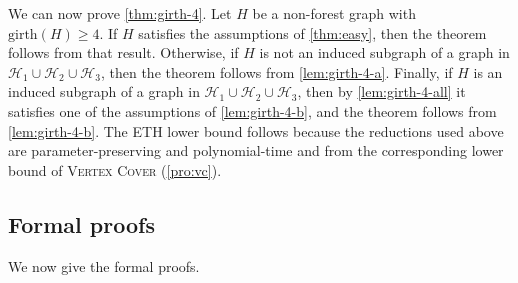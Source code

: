 \documentclass[a4paper,UKenglish,cleveref, autoref, thm-restate]{lipics-v2021}
\newcommand{\girth}{\mathrm{girth}}
\newcommand{\cH}{\mathcal{H}}
\begin{document}
We can now prove \cref{thm:girth-4}.
Let $H$ be a non-forest graph with $\girth(H)\geq 4$.
If $H$ satisfies the assumptions of \cref{thm:easy}, then the theorem follows from that result.
Otherwise, if $H$ is not an induced subgraph of a graph in
$\mathcal H_1\cup\mathcal H_2\cup\mathcal H_3$, then the theorem follows from
\cref{lem:girth-4-a}.
Finally, if $H$ is an induced subgraph of a graph in
$\mathcal H_1\cup\mathcal H_2\cup\mathcal H_3$, then by \cref{lem:girth-4-all} it satisfies one of the assumptions of \cref{lem:girth-4-b}, and the theorem follows from \cref{lem:girth-4-b}.
The ETH lower bound follows because the reductions used above are parameter-preserving and polynomial-time and from the 
corresponding lower bound of \textsc{Vertex Cover} (\cref{pro:vc}).

\subsection{Formal proofs}
We now give the formal proofs.






\GirthFourLemmaa*
\end{document}
